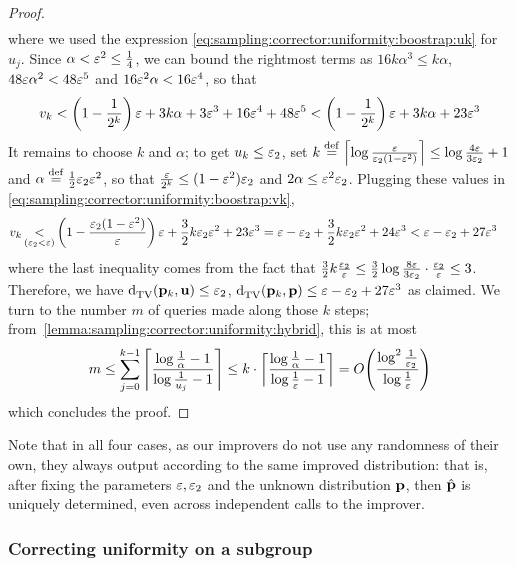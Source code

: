\begin{proof}
\begin{align*}
\end{align*}
where we used the expression \eqref{eq:sampling:corrector:uniformity:boostrap:uk} for $u_j$. Since $\alpha < \varepsilon^2 \leq \frac{1}{4}$, we can bound the rightmost terms as $16k\alpha^3 \leq k\alpha$, $48\varepsilon\alpha^2<48\varepsilon^5$ and $16\varepsilon^2\alpha < 16\varepsilon^4$, so that 
\begin{equation}\label{eq:sampling:corrector:uniformity:boostrap:vk}
  v_k < \left( 1-\frac{1}{2^k} \right)\varepsilon + 3k\alpha + 3\varepsilon^3+16\varepsilon^4+48\varepsilon^5 < \left( 1-\frac{1}{2^k} \right)\varepsilon + 3k\alpha + 23\varepsilon^3
\end{equation}
It remains to choose $k$ and $\alpha$; to get $u_k \leq \varepsilon_2$, set $k\stackrel{\rm def}{=}\left\lceil \log\frac{\varepsilon}{\varepsilon_2(1-\varepsilon^2)} \right\rceil\leq \log\frac{4\varepsilon}{3\varepsilon_2}+1$ and $\alpha\stackrel{\rm def}{=}\frac{1}{2}\varepsilon_2\varepsilon^2$, so that $\frac{\varepsilon}{2^k}\leq (1-\varepsilon^2)\varepsilon_2$ and $2\alpha \leq \varepsilon^2\varepsilon_2$. Plugging these values in \eqref{eq:sampling:corrector:uniformity:boostrap:vk},
\begin{align*}
  v_k &\operatorname*{<}_{(\varepsilon_2<\varepsilon)} \left( 1-\frac{\varepsilon_2(1-\varepsilon^2)}{\varepsilon} \right)\varepsilon + \frac{3}{2}k\varepsilon_2\varepsilon^2 + 23\varepsilon^3 
    = \varepsilon - \varepsilon_2 + \frac{3}{2}k\varepsilon_2\varepsilon^2 + 24\varepsilon^3 
    < \varepsilon - \varepsilon_2 + 27\varepsilon^3
\end{align*}
where the last inequality comes from the fact that $\frac{3}{2}k\frac{\varepsilon_2}{\varepsilon} \leq \frac{3}{2}\log\frac{8\varepsilon}{3\varepsilon_2}\cdot\frac{\varepsilon_2}{\varepsilon}\leq 3$.
Therefore, we have ${\operatorname{d}_{\textrm{TV}}^{}\!\left({\mathbf{p}_k, \mathbf{u}}\right)}\leq \varepsilon_2$, ${\operatorname{d}_{\textrm{TV}}^{}\!\left({\mathbf{p}_k, \mathbf{p}}\right)} \leq \varepsilon - \varepsilon_2 + 27\varepsilon^3$ as claimed. We turn to the number $m$ of queries made along those $k$ steps; from~\cref{lemma:sampling:corrector:uniformity:hybrid}, this is at most
\begin{align*}
  m \leq \sum_{j=0}^{k-1} \clg{ \frac{\log\frac{1}{\alpha}-1}{\log\frac{1}{u_j}-1} } \leq k\cdot \clg{ \frac{\log\frac{1}{\alpha}-1}{\log\frac{1}{\eps}-1} }= \bigO{ \frac{\log^2\frac{1}{\eps_2}}{\log\frac{1}{\eps}} }
\end{align*}
which concludes the proof.
\end{proof}

Note that in all four cases, as our improvers do not use any randomness of their own, 
they always output according to the same improved distribution: that is, after fixing 
the parameters $\varepsilon, \varepsilon_2$ and the unknown distribution $\mathbf{p}$, then $\hat{\mathbf{p}}$ is 
uniquely determined, even across independent calls to the improver.
 
\subsubsection{Correcting uniformity on a subgroup}\label{sec:unif:subgroup}
